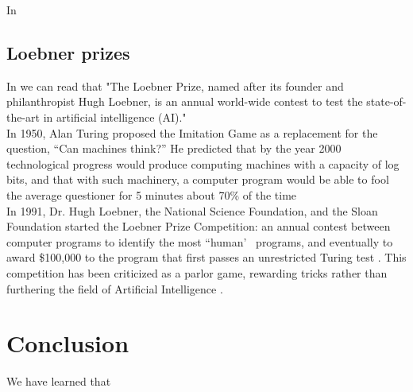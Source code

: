 \documentclass[12pt,twoside]{article}
\theoremstyle{plain}
\theoremstyle{definition}
\theoremstyle{remark}
\begin{document}
In \cite{HILL2015245}

\subsection{Loebner prizes}
	\label{sec:loebner}
	
	In \cite{loebner2011} we can read that "The Loebner Prize, named after its founder and philanthropist Hugh Loebner, is an annual world-wide contest to test the state-of-the-art in artificial intelligence (AI)."\\
	
In 1950, Alan Turing proposed the Imitation Game as a replacement for the question, “Can machines think?” He predicted that by the year 2000 technological progress would produce computing machines with a capacity of log bits, and that with such machinery, a computer program would be able to fool the average questioner for 5 minutes about 70\% of the time \cite{turing2009computing}\\

In 1991, Dr. Hugh Loebner, the National Science Foundation, and the Sloan Foundation started the Loebner Prize Competition: an annual contest between computer programs to identify the most “human’~ programs, and eventually to award \$100,000 to the program that first passes an unrestricted Turing test \cite{epstein1992quest}. This competition has been criticized as a parlor game, rewarding tricks rather than furthering the field of Artificial Intelligence \cite{shieber1994lessons}. \\

\section{Conclusion}
\label{sec:conclusion}

We have learned that

%
%
\nocite{*}

\newpage


\end{document}
